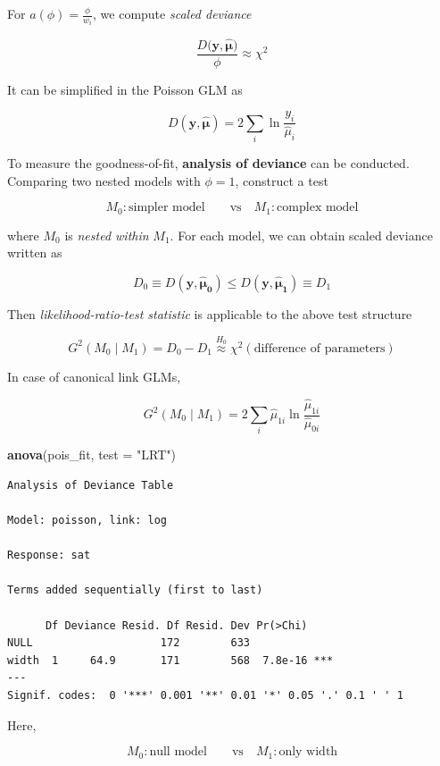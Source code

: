 \documentclass[]{book}
\newenvironment{Shaded}{\begin{snugshade}}{\end{snugshade}}
\newcommand{\DataTypeTok}[1]{\textcolor[rgb]{0.13,0.29,0.53}{#1}}
\newcommand{\KeywordTok}[1]{\textcolor[rgb]{0.13,0.29,0.53}{\textbf{#1}}}
\newcommand{\NormalTok}[1]{#1}
\newcommand{\StringTok}[1]{\textcolor[rgb]{0.31,0.60,0.02}{#1}}
\begin{document}
For \(a(\phi) = \frac{\phi}{w_i}\), we compute \emph{scaled deviance}

\[\frac{D(\mathbf{y}, \boldsymbol{\hat\mu)}}{\phi} \approx \chi^2\]

It can be simplified in the Poisson GLM as

\[D(\mathbf{y}, \boldsymbol{\hat\mu}) = 2\sum_i\ln\frac{y_i}{\hat\mu_i}\]

To measure the goodness-of-fit, \textbf{analysis of deviance} can be conducted. Comparing two nested models with \(\phi = 1\), construct a test

\[M_0: \text{simpler model} \qquad\text{vs}\quad M_1: \text{complex model}\]

where \(M_0\) is \emph{nested within} \(M_1\). For each model, we can obtain scaled deviance written as

\[D_0 \equiv D(\mathbf{y}, \boldsymbol{\hat\mu_0}) \le D(\mathbf{y}, \boldsymbol{\hat\mu_1}) \equiv D_1\]

Then \emph{likelihood-ratio-test statistic} is applicable to the above test structure

\[G^2(M_0 \mid M_1) = D_0 - D_1 \stackrel{H_0}{\approx} \chi^2(\text{difference of parameters})\]

In case of canonical link GLMs,

\[G^2(M_0 \mid M_1) = 2\sum_i\hat\mu_{1i}\ln\frac{\hat\mu_{1i}}{\hat\mu_{0i}}\]

\begin{Shaded}
\begin{Highlighting}[]
\KeywordTok{anova}\NormalTok{(pois_fit, }\DataTypeTok{test =} \StringTok{"LRT"}\NormalTok{)}
\end{Highlighting}
\end{Shaded}

\begin{verbatim}
Analysis of Deviance Table

Model: poisson, link: log

Response: sat

Terms added sequentially (first to last)

      Df Deviance Resid. Df Resid. Dev Pr(>Chi)    
NULL                    172        633             
width  1     64.9       171        568  7.8e-16 ***
---
Signif. codes:  0 '***' 0.001 '**' 0.01 '*' 0.05 '.' 0.1 ' ' 1
\end{verbatim}

Here,

\[M_0: \text{null model} \qquad\text{vs}\quad M_1: \text{only width}\]
\end{document}
